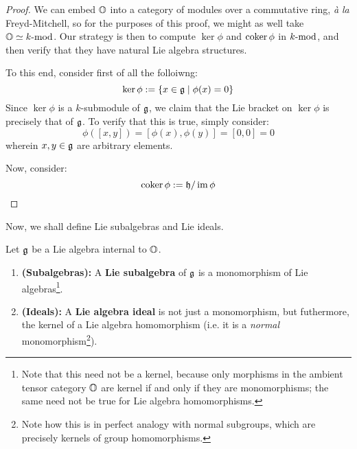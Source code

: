                 \begin{proof}
                    We can embed $\O$ into a category of modules over a commutative ring, \textit{\`a la} Freyd-Mitchell, so for the purposes of this proof, we might as well take $\O \cong k\mod$. Our strategy is then to compute $\ker \phi$ and $\coker \phi$ in $k\mod$, and then verify that they have natural Lie algebra structures. 
                    
                    To this end, consider first of all the folloiwng:
                        $$\ker \phi := \{x \in \g \mid \phi(x) = 0\}$$
                    Since $\ker \phi$ is a $k$-submodule of $\g$, we claim that the Lie bracket on $\ker \phi$ is precisely that of $\g$. To verify that this is true, simply consider:
                        $$\phi([x, y]) = [\phi(x), \phi(y)] = [0, 0] = 0$$
                    wherein $x, y \in \g$ are arbitrary elements. 
                    
                    Now, consider:
                        $$\coker \phi := \h/\im\phi$$
                \end{proof}
            
            Now, we shall define Lie subalgebras and Lie ideals. 
            \begin{definition} \label{def: lie_subalgebras_and_lie_ideals}
                Let $\g$ be a Lie algebra internal to $\O$. 
                    \begin{enumerate}
                        \item \textbf{(Subalgebras):} A \textbf{Lie subalgebra} of $\g$ is a monomorphism of Lie algebras\footnote{Note that this need not be a kernel, because only  morphisms in the ambient tensor category $\O$ are kernel if and only if they are monomorphisms; the same need not be true for Lie algebra homomorphisms.}.
                        \item \textbf{(Ideals):} A \textbf{Lie algebra ideal} is not just a monomorphism, but futhermore, the kernel of a Lie algebra homomorphism (i.e. it is a \textit{normal} monomorphism\footnote{Note how this is in perfect analogy with normal subgroups, which are precisely kernels of group homomorphisms.}). 
                    \end{enumerate}
            \end{definition}
        
